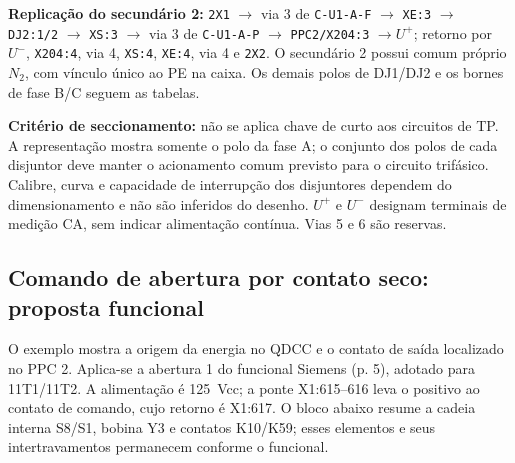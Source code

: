\documentclass[11pt,a4paper]{article}
\begin{document}
\textbf{Replicação do secundário 2:}
\texttt{2X1} $\rightarrow$ via 3 de \texttt{C-U1-A-F}
$\rightarrow$ \texttt{XE:3} $\rightarrow$ \texttt{DJ2:1/2}
$\rightarrow$ \texttt{XS:3} $\rightarrow$ via 3 de
\texttt{C-U1-A-P} $\rightarrow$ \texttt{PPC2/X204:3} $\rightarrow U^{+}$;
retorno por $U^{-}$, \texttt{X204:4}, via 4, \texttt{XS:4},
\texttt{XE:4}, via 4 e \texttt{2X2}. O secundário 2 possui comum próprio
$N_2$, com vínculo único ao PE na caixa. Os demais polos de DJ1/DJ2
e os bornes de fase B/C seguem as tabelas.

\textbf{Critério de seccionamento:} não se aplica chave de curto aos
circuitos de TP. A representação mostra somente o polo da fase A;
o conjunto dos polos de cada disjuntor deve manter o acionamento comum
previsto para o circuito trifásico. Calibre, curva e capacidade de
interrupção dos disjuntores dependem do dimensionamento e não são
inferidos do desenho. $U^{+}$ e $U^{-}$ designam terminais de medição CA,
sem indicar alimentação contínua. Vias 5 e 6 são reservas.

\clearpage
\subsection{Comando de abertura por contato seco: proposta funcional}

O exemplo mostra a origem da energia no QDCC e o contato de saída
localizado no PPC 2. Aplica-se a abertura 1 do funcional Siemens (p. 5),
adotado para 11T1/11T2. A alimentação é 125~Vcc; a ponte X1:615--616
leva o positivo ao contato de comando, cujo retorno é X1:617.
O bloco abaixo resume a cadeia interna S8/S1, bobina Y3 e contatos K10/K59;
esses elementos e seus intertravamentos permanecem conforme o funcional.
\end{document}
